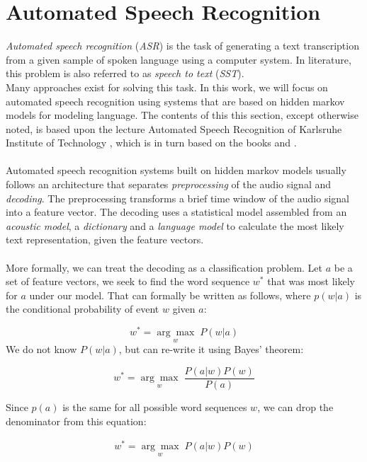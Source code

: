 
\section{Automated Speech Recognition}
\label{ch:HMM_ASR}
\textit{Automated speech recognition} (\textit{ASR}) is the task of generating a text transcription from a given sample of spoken language using a computer system. In literature, this problem is also referred to as \textit{speech to text} (\textit{SST}). \\
Many approaches exist for solving this task. In this work, we will focus on automated speech recognition using systems that are based on hidden markov models for modeling language. The contents of this this section, except otherwise noted, is based upon the lecture Automated Speech Recognition of Karlsruhe Institute of Technology \cite{kitasr2018stueker}, which is in turn based on the books \cite{schukat1995automatische} and \cite{huang2001spoken}. \\ \\
Automated speech recognition systems built on hidden markov models usually follows an architecture that separates \textit{preprocessing} of the audio signal and \textit{decoding}. The preprocessing transforms a brief time window of the audio signal into a feature vector. The decoding uses a statistical model assembled from an \textit{acoustic model}, a \textit{dictionary} and a \textit{language model} to calculate the most likely text representation, given the feature vectors.\\ \\

More formally, we can treat the decoding as a classification problem. Let $a$ be a set of feature vectors, we seek to find the word sequence $w^*$ that was most likely for $a$ under our model. That can formally be written as follows, where $p(w|a)$ is the conditional probability of event $w$ given $a$:

\[
w^* = \underset{w}{\arg \max} \; P(w|a)
\] 
We do not know $P(w|a)$, but can re-write it using Bayes' theorem:

\[
w^* = \underset{w}{\arg \max} \; \frac{P(a|w) P(w)}{P(a)}
\]

Since $p(a)$ is the same for all possible word sequences $w$, we can drop the denominator from this equation:

\begin{align}
w^* = \underset{w}{\arg \max} \; P(a|w) P(w)
\label{eq:asr_base_formula}
\end{align}

